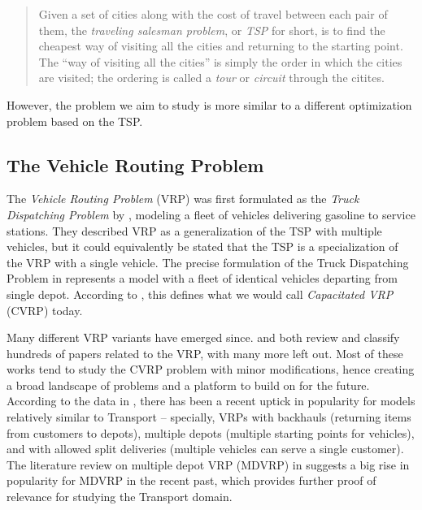 \begin{quote}
Given a set of cities along with the cost of travel between each pair of them, the \textit{traveling salesman problem}, or \textit{TSP} for short, is to find the cheapest way of visiting all the cities and returning to the starting point. The ``way of visiting all the cities'' is simply the order in which the cities are visited; the ordering is called a \textit{tour} or \textit{circuit} through the citites.
\end{quote}

However, the problem we aim to study is more similar to a different optimization problem based on the TSP.

\subsection{The Vehicle Routing Problem}

The \textit{Vehicle Routing Problem} (VRP) was first formulated as the \textit{Truck Dispatching Problem} by \citet{Dantzig1959}, modeling a fleet of vehicles delivering gasoline to service stations. They described VRP as a generalization of the TSP with multiple vehicles, but it could equivalently be stated that the TSP is a specialization of the VRP
with a single vehicle. The precise formulation of the Truck Dispatching Problem in \citep[Section~2]{Dantzig1959} represents a model with a fleet of identical vehicles departing from single depot. According to \citet[Section~3]{Braekers2016}, this defines what we would call \textit{Capacitated VRP} (CVRP) today.

Many different VRP variants have emerged since. \citet{Eksioglu2009} and \citet{Braekers2016} both
review and classify hundreds of papers related to the VRP, with many more left out.
Most of these works tend to study the CVRP problem with minor modifications, hence creating
a broad landscape of problems and a platform to build on for the future.
According to the data in \citet[Table~4]{Braekers2016}, there has been a recent uptick
in popularity for models relatively similar to Transport -- specially, VRPs with
backhauls (returning items from customers to depots),
multiple depots (multiple starting points for vehicles), and with allowed split deliveries (multiple
vehicles can serve a single customer).
The literature review on multiple depot VRP (MDVRP) in \citet{Montoya-Torres2015}
suggests a big rise in popularity for MDVRP in the recent past,
which provides further proof of relevance for studying the Transport domain.

